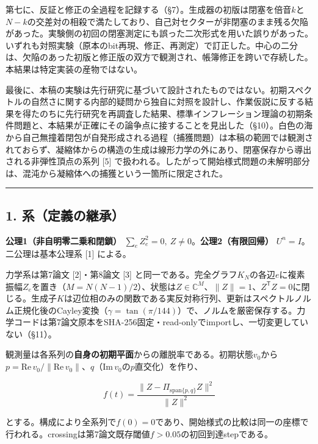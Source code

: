 \documentclass[
  a4paper,
]{ltjsarticle}
\begin{document}
第七に、反証と修正の全過程を記録する（§7）。生成器の初版は閉塞を倍音\(k\)と\(N-k\)の交差対の相殺で満たしており、自己対セクターが非閉塞のまま残る欠陥があった。実験側の初回の閉塞測定にも誤った二次形式を用いた誤りがあった。いずれも対照実験（原本のbit再現、修正、再測定）で訂正した。中心の二分は、欠陥のあった初版と修正版の双方で観測され、帳簿修正を跨いで存続した。本結果は特定実装の産物ではない。

最後に、本稿の実験は先行研究に基づいて設計されたものではない。初期スペクトルの自然さに関する内部的疑問から独自に対照を設計し、作業仮説に反する結果を得たのちに先行研究を再調査した結果、標準インフレーション理論の初期条件問題と、本結果が正確にその論争点に接することを見出した（§10）。白色の海から自己無撞着閉包が自発形成される過程（捕獲問題）は本稿の範囲では観測されておらず、凝縮体からの構造の生成は線形力学の外にあり、閉塞保存から導出される非弾性頂点の系列
{[}5{]}
で扱われる。したがって開始様式問題の未解明部分は、混沌から凝縮体への捕獲という一箇所に限定された。

\begin{center}\rule{0.5\linewidth}{0.5pt}\end{center}

\subsection{1.
系（定義の継承）}\label{ux7cfbux5b9aux7fa9ux306eux7d99ux627f}

\textbf{公理1（非自明零二乗和閉鎖）}
\(\sum_e Z_e^2=0,\ Z\neq0\)。\textbf{公理2（有限回帰）}
\(U^n=I\)。二公理は基本公理系 {[}1{]} による。

力学系は第7論文 {[}2{]}・第8論文 {[}3{]}
と同一である。完全グラフ\(K_N\)の各辺\(e\)に複素振幅\(Z_e\)を置き（\(M=N(N-1)/2\)）、状態は\(Z\in\mathbb C^M\)、\(\lVert Z\rVert=1\)、\(Z^{\mathsf T}Z=0\)に閉じる。生成子\(K\)は辺位相のみの関数である実反対称行列、更新はスペクトルノルム正規化後のCayley変換（\(\gamma=\tan(\pi/144)\)）で、ノルムを厳密保存する。力学コードは第7論文原本をSHA-256固定・read-onlyでimportし、一切変更していない（§11）。

観測量は各系列の\textbf{自身の初期平面}からの離脱率である。初期状態\(v_0\)から\(p=\mathrm{Re}\,v_0/\lVert\mathrm{Re}\,v_0\rVert\)、\(q\)（\(\mathrm{Im}\,v_0\)の\(p\)直交化）を作り、

\[f(t)=\frac{\lVert Z-\Pi_{\mathrm{span}\{p,q\}}Z\rVert^2}{\lVert Z\rVert^2}\]

とする。構成により全系列で\(f(0)=0\)であり、開始様式の比較は同一の座標で行われる。crossingは第7論文既存閾値\(f>0.05\)の初回到達stepである。
\end{document}
